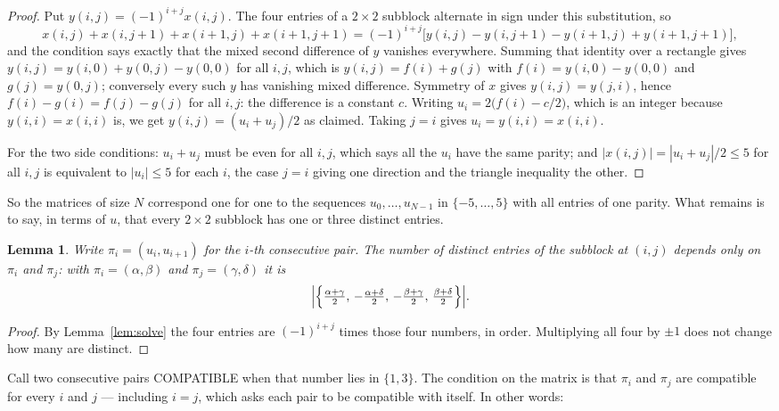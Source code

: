 \documentclass[11pt,a4paper]{article}
\theoremstyle{plain}
\newtheorem{lemma}[theorem]{Lemma}
\theoremstyle{definition}
\begin{document}
\begin{proof}
Put $y(i,j)=(-1)^{i+j}x(i,j)$. The four entries of a $2\times2$ subblock alternate in sign
under this substitution, so
\[
x(i,j)+x(i,j{+}1)+x(i{+}1,j)+x(i{+}1,j{+}1)
=(-1)^{i+j}\bigl[y(i,j)-y(i,j{+}1)-y(i{+}1,j)+y(i{+}1,j{+}1)\bigr],
\]
and the condition says exactly that the mixed second difference of $y$ vanishes everywhere.
Summing that identity over a rectangle gives
$y(i,j)=y(i,0)+y(0,j)-y(0,0)$ for all $i,j$, which is $y(i,j)=f(i)+g(j)$ with
$f(i)=y(i,0)-y(0,0)$ and $g(j)=y(0,j)$; conversely every such $y$ has vanishing mixed
difference. Symmetry of $x$ gives $y(i,j)=y(j,i)$, hence $f(i)-g(i)=f(j)-g(j)$ for all $i,j$:
the difference is a constant $c$. Writing $u_i=2\bigl(f(i)-c/2\bigr)$, which is an integer
because $y(i,i)=x(i,i)$ is, we get $y(i,j)=(u_i+u_j)/2$ as claimed. Taking $j=i$ gives
$u_i=y(i,i)=x(i,i)$.

For the two side conditions: $u_i+u_j$ must be even for all $i,j$, which says all the $u_i$ have
the same parity; and $|x(i,j)|=|u_i+u_j|/2\le5$ for all $i,j$ is equivalent to $|u_i|\le5$
for each $i$, the case $j=i$ giving one direction and the triangle inequality the other.
\end{proof}

So the matrices of size $N$ correspond one for one to the sequences $u_0,\dots,u_{N-1}$ in
$\{-5,\dots,5\}$ with all entries of one parity. What remains is to say, in terms of $u$,
that every $2\times2$ subblock has one or three distinct entries.

\begin{lemma}\label{lem:block}
Write $\pi_i=(u_i,u_{i+1})$ for the $i$-th consecutive pair. The number of distinct entries of
the subblock at $(i,j)$ depends only on $\pi_i$ and $\pi_j$: with $\pi_i=(\alpha,\beta)$ and
$\pi_j=(\gamma,\delta)$ it is
\[
\Bigl|\Bigl\{\tfrac{\alpha+\gamma}{2},\,-\tfrac{\alpha+\delta}{2},\,
-\tfrac{\beta+\gamma}{2},\,\tfrac{\beta+\delta}{2}\Bigr\}\Bigr| .
\]
\end{lemma}

\begin{proof}
By Lemma~\ref{lem:solve} the four entries are $(-1)^{i+j}$ times those four numbers, in
order. Multiplying all four by $\pm1$ does not change how many are distinct.
\end{proof}

Call two consecutive pairs COMPATIBLE when that number lies in $\{1,3\}$. The condition on the
matrix is that $\pi_i$ and $\pi_j$ are compatible for every $i$ and $j$ --- including $i=j$,
which asks each pair to be compatible with itself. In other words:
\end{document}
